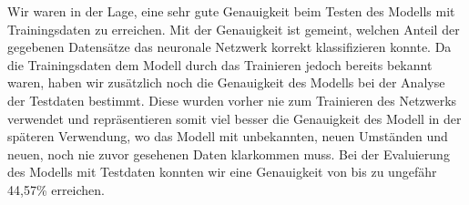 \documentclass[10pt]{article}
\begin{document}




Wir waren in der Lage, eine sehr gute Genauigkeit beim Testen des Modells mit Trainingsdaten zu erreichen. 
Mit der Genauigkeit ist gemeint, welchen Anteil der gegebenen Datensätze das neuronale Netzwerk korrekt klassifizieren konnte. 
Da die Trainingsdaten dem Modell durch das Trainieren jedoch bereits bekannt waren, haben wir zusätzlich noch die Genauigkeit des Modells bei der Analyse der Testdaten bestimmt. 
Diese wurden vorher nie zum Trainieren des Netzwerks verwendet und repräsentieren somit viel besser die Genauigkeit des Modell in der späteren Verwendung, wo das Modell mit unbekannten, neuen Umständen und neuen, noch nie zuvor gesehenen Daten klarkommen muss.
Bei der Evaluierung des Modells mit Testdaten konnten wir eine Genauigkeit von bis zu ungefähr 44,57\% erreichen. 
\end{document}
